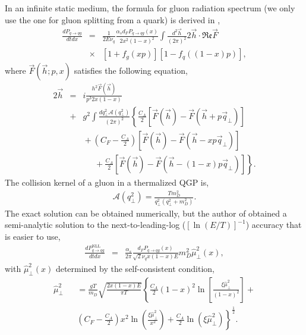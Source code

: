 \documentclass[aps, prc, reprint, amsmath, groupedaddress, nofootinbib]{revtex4-1}
\begin{document}
In an infinite static medium, the formula for gluon radiation spectrum (we only use the one for gluon splitting from a quark) is derived in \cite{Arnold:2002zm,Arnold:2003zc},
\begin{eqnarray}\label{eq:AMY-1}
\nonumber
\frac{dP_{q\rightarrow qg}}{dt dx} &=& \frac{1}{2E\nu_q} \frac{\alpha_s d_F P_{q\rightarrow qg}(x)}{2x^2(1-x)^2}\int\frac{d^2\vec{h}}{(2\pi)^2}2\vec{h}\cdot \mathfrak{Re} \vec{F} \\
&\times& [1+f_g(xp)][1-f_q((1-x)p)],
\end{eqnarray}
where $\vec{F}(\vec{h}; p, x)$ satisfies the following equation,
\begin{eqnarray}\label{eq:AMY-2}
\nonumber
2\vec{h} &=& i\frac{h^2 \vec{F}(\vec{h})}{p^3 2x(1-x)} \\
\nonumber
&+& g^2\int \frac{dq_\perp^2 \mathcal{A}(q_\perp^2)}{(2\pi)^2}\left\{\frac{C_A}{2}\left[\vec{F}(\vec{h}) - \vec{F}(\vec{h}+p\vec{q}_\perp)\right]\right. \\
\nonumber
&& \phantom{} + \left(C_F - \frac{C_A}{2}\right)\left[\vec{F}(\vec{h}) - \vec{F}(\vec{h}-xp\vec{q}_\perp)\right] \\
&& \phantom{sss} + \left. \frac{C_A}{2}\left[\vec{F}(\vec{h}) - \vec{F}(\vec{h}-(1-x)p\vec{q}_\perp)\right] \right\}.
\end{eqnarray}
The collision kernel of a gluon in a thermalized QGP is,
\begin{eqnarray}
\mathcal{A}(q_\perp^2) = \frac{T m_D^2}{q_\perp^2(q_\perp^2+m_D^2)}.
\end{eqnarray}
The exact solution can be obtained numerically, but the author of \cite{Arnold:2008zu} obtained a semi-analytic solution to the next-to-leading-log ($[\ln(E/T)]^{-1}$) accuracy that is easier to use,
\begin{eqnarray}\label{eq:AMY-NLL}
\frac{dP_{q\rightarrow qg}^{\textrm{NLL}}}{dt dx} &=& \frac{\alpha_s}{2\pi}\frac{ d_F P_{q\rightarrow qg}(x)}{\sqrt{2}\nu_q x(1-x)E} m_D^2 \hat{\mu}_\perp^2(x),
\end{eqnarray}
with $\hat{\mu}_\perp^2(x)$ determined by the self-consistent condition,
\begin{eqnarray}\label{eq:AMY-sf}
\nonumber
\hat{\mu}_\perp^2 && = \frac{gT}{m_D} \sqrt{\frac{2x(1-x)E}{\pi T}}\left\{
\frac{C_A}{2}(1-x)^2\ln\left[\frac{\xi\hat{\mu}_\perp^2}{(1-x)^2}\right] + \right. \\
&&\left.\left(C_F-\frac{C_A}{2}\right)x^2\ln\left(\frac{\xi\hat{\mu}_\perp^2}{x^2}\right) + \frac{C_A}{2}\ln(\xi\hat{\mu}_\perp^2)\right\}^{\frac{1}{2}}.
\end{eqnarray}
\end{document}
